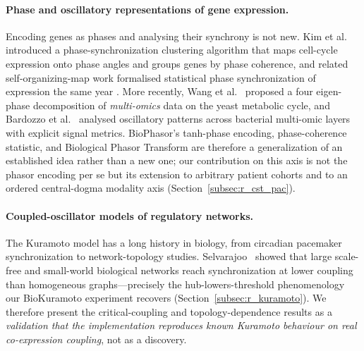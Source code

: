 \documentclass[preprint,12pt,amsmath,amssymb,superscriptaddress,floatfix]{revtex4-2}
\begin{document}
\paragraph{Phase and oscillatory representations of gene expression.}
Encoding genes as phases and analysing their synchrony is not new. Kim et al.~\citep{kim2008bmc}
introduced a phase-synchronization clustering algorithm that maps cell-cycle
expression onto phase angles and groups genes by phase coherence, and related
self-organizing-map work formalised statistical phase synchronization of
expression the same year \citep{kim2008somps}. More recently, Wang et al.~\citep{wang2025} proposed a four
eigen-phase decomposition of \emph{multi-omics} data on the yeast metabolic
cycle, and Bardozzo et al.~\citep{bardozzo2020} analysed oscillatory patterns across bacterial
multi-omic layers with explicit signal metrics. BioPhasor's tanh-phase encoding,
phase-coherence statistic, and Biological Phasor Transform are therefore a
generalization of an established idea rather than a new one; our contribution on
this axis is not the phasor encoding per se but its extension to arbitrary
patient cohorts and to an ordered central-dogma modality axis
(Section~\ref{subsec:r_cst_pac}).

\paragraph{Coupled-oscillator models of regulatory networks.}
The Kuramoto model has a long history in biology, from circadian pacemaker
synchronization to network-topology studies. Selvarajoo~\citep{selvarajoo2019} showed that
large scale-free and small-world biological networks reach synchronization at
lower coupling than homogeneous graphs---precisely the hub-lowers-threshold
phenomenology our BioKuramoto experiment recovers
(Section~\ref{subsec:r_kuramoto}). We therefore present the critical-coupling
and topology-dependence results as a \emph{validation that the implementation
reproduces known Kuramoto behaviour on real co-expression coupling}, not as a
discovery.
\end{document}
